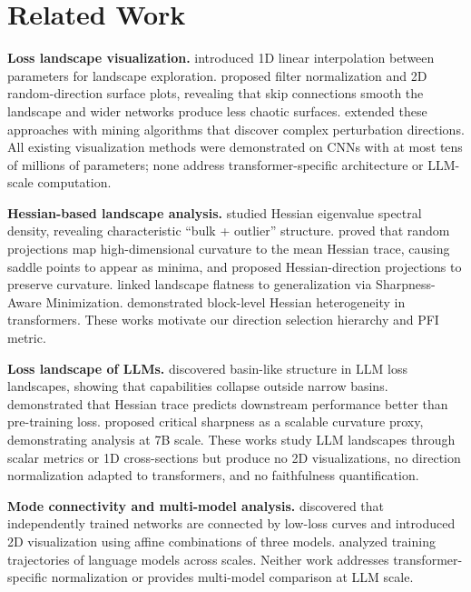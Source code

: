 \documentclass{article}
\begin{document}
\section{Related Work}
\label{sec:related}

\textbf{Loss landscape visualization.}
\citet{goodfellow2015qualitatively} introduced 1D linear interpolation between parameters for landscape exploration. \citet{li2018visualizing} proposed filter normalization and 2D random-direction surface plots, revealing that skip connections smooth the landscape and wider networks produce less chaotic surfaces. \citet{xu2024visualizing} extended these approaches with mining algorithms that discover complex perturbation directions. All existing visualization methods were demonstrated on CNNs with at most tens of millions of parameters; none address transformer-specific architecture or LLM-scale computation.

\textbf{Hessian-based landscape analysis.}
\citet{ghorbani2019investigation} studied Hessian eigenvalue spectral density, revealing characteristic ``bulk + outlier'' structure. \citet{bottcher2024visualizing} proved that random projections map high-dimensional curvature to the mean Hessian trace, causing saddle points to appear as minima, and proposed Hessian-direction projections to preserve curvature. \citet{foret2021sharpness} linked landscape flatness to generalization via Sharpness-Aware Minimization. \citet{zhang2024why} demonstrated block-level Hessian heterogeneity in transformers. These works motivate our direction selection hierarchy and PFI metric.

\textbf{Loss landscape of LLMs.}
\citet{chen2025unveiling} discovered basin-like structure in LLM loss landscapes, showing that capabilities collapse outside narrow basins. \citet{liu2023same} demonstrated that Hessian trace predicts downstream performance better than pre-training loss. \citet{kalra2026scalable} proposed critical sharpness as a scalable curvature proxy, demonstrating analysis at 7B scale. These works study LLM landscapes through scalar metrics or 1D cross-sections but produce no 2D visualizations, no direction normalization adapted to transformers, and no faithfulness quantification.

\textbf{Mode connectivity and multi-model analysis.}
\citet{garipov2018loss} discovered that independently trained networks are connected by low-loss curves and introduced 2D visualization using affine combinations of three models. \citet{xia2023training} analyzed training trajectories of language models across scales. Neither work addresses transformer-specific normalization or provides multi-model comparison at LLM scale.
\end{document}
